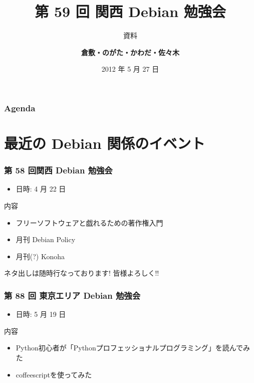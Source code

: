 \documentclass[cjk,dvipdfmx,10pt,%
hyperref={bookmarks=true,bookmarksnumbered=true,bookmarksopen=false,%
colorlinks=false,%
pdftitle={第 59 回 関西 Debian 勉強会},%
pdfauthor={倉敷・のがた・かわだ・佐々木},%
pdfsubject={資料},%
}]{beamer}
\title{第 59 回 関西 Debian 勉強会}
\subtitle{{\scriptsize 資料}}
\author[かわだ てつたろう]{{\large\bf 倉敷・のがた・かわだ・佐々木}}
\institute[Debian JP]{{\normalsize\tt 関西 Debian 勉強会}}
\date{{\small 2012 年 5 月 27 日}}
\begin{document}
\settitleslide
\begin{frame}
\titlepage
\end{frame}
\setdefaultslide

\begin{frame}[fragile]
\frametitle{Agenda}

\tableofcontents

\end{frame}

\section{最近の Debian 関係のイベント}


\begin{frame}[fragile]
\frametitle{第 58 回関西 Debian 勉強会}

\begin{itemize}
\item 日時: 4 月 22 日
\end{itemize}

\begin{block}{内容}
  \begin{itemize}
  \item フリーソフトウェアと戯れるための著作権入門
  \item 月刊 Debian Policy
  \item 月刊(?) Konoha
  \end{itemize}
\end{block}
ネタ出しは随時行なっております! 皆様よろしく!!
\end{frame}

\begin{frame}[fragile]
  \frametitle{第 88 回 東京エリア Debian 勉強会}
  \begin{itemize}
  \item  日時: 5 月 19 日
  \end{itemize}
  \begin{block}{内容}
    \begin{itemize}
    \item Python初心者が「Pythonプロフェッショナルプログラミング」を読んでみた
    \item coffeescriptを使ってみた
    \end{itemize}
  \end{block}
\end{frame}

\end{document}
